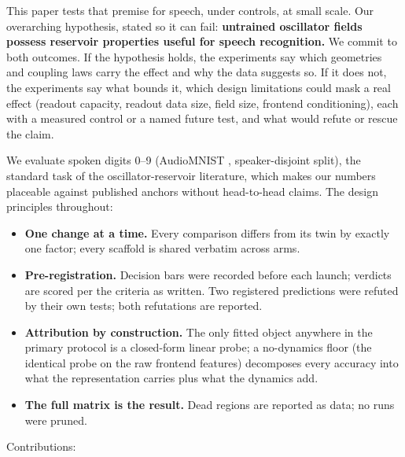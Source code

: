 \documentclass[10pt]{article}
\providecommand{\tightlist}{%
  \setlength{\itemsep}{0pt}\setlength{\parskip}{0pt}}
\begin{document}
This paper tests that premise for speech, under controls, at small
scale. Our overarching hypothesis, stated so it can fail:
\textbf{untrained oscillator fields possess reservoir properties useful
for speech recognition.} We commit to both outcomes. If the hypothesis
holds, the experiments say which geometries and coupling laws carry the
effect and why the data suggests so. If it does not, the experiments say
what bounds it, which design limitations could mask a real effect
(readout capacity, readout data size, field size, frontend
conditioning), each with a measured control or a named future test, and
what would refute or rescue the claim.

We evaluate spoken digits 0--9 (AudioMNIST \citep{becker2024},
speaker-disjoint split), the standard task of the oscillator-reservoir
literature, which makes our numbers placeable against published anchors
without head-to-head claims. The design principles throughout:

\begin{itemize}
\tightlist
\item
  \textbf{One change at a time.} Every comparison differs from its twin
  by exactly one factor; every scaffold is shared verbatim across arms.
\item
  \textbf{Pre-registration.} Decision bars were recorded before each
  launch; verdicts are scored per the criteria as written. Two
  registered predictions were refuted by their own tests; both
  refutations are reported.
\item
  \textbf{Attribution by construction.} The only fitted object anywhere
  in the primary protocol is a closed-form linear probe; a no-dynamics
  floor (the identical probe on the raw frontend features) decomposes
  every accuracy into what the representation carries plus what the
  dynamics add.
\item
  \textbf{The full matrix is the result.} Dead regions are reported as
  data; no runs were pruned.
\end{itemize}

Contributions:
\end{document}
